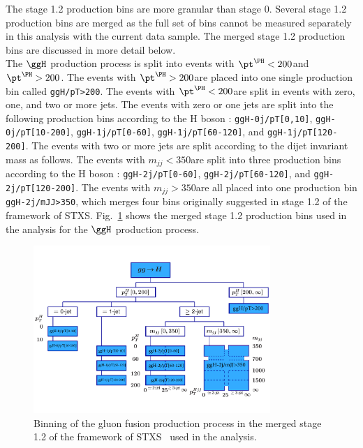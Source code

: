 The stage 1.2 production bins are more granular than stage 0.
Several stage 1.2 production bins are merged as the full set of bins cannot be measured separately in this analysis with the current data sample.
The merged stage 1.2 production bins are discussed in more detail below.
\\
The $\ggH$ production process is split into events with $\pt^{\PH}<200$\GeV and $\pt^{\PH}>200$\GeV.
The events with $\pt^{\PH}>200$\GeV are placed into one single production bin called {\tt ggH/pT>200}.
The events with $\pt^{\PH}<200$\GeV are split in events with zero, one, and two or more jets.
The events with zero or one jets are split into the following production bins according to the H boson \pt : {\tt ggH-0j/pT[0,10]}, {\tt ggH-0j/pT[10-200]}, {\tt ggH-1j/pT[0-60]}, {\tt ggH-1j/pT[60-120]}, and {\tt ggH-1j/pT[120-200]}.
The events with two or more jets are split according to the dijet invariant mass as follows.
The events with $m_{jj}<350$\GeV are split into three production bins according to the H boson \pt: {\tt ggH-2j/pT[0-60]}, {\tt ggH-2j/pT[60-120]}, and {\tt ggH-2j/pT[120-200]}.
The events with $m_{jj}>350$\GeV are all placed into one production bin {\tt ggH-2j/mJJ>350}, which merges four bins originally suggested in stage 1.2 of the framework of STXS.
Fig.~\ref{fig:stage1_ggH} shows the merged stage 1.2 production bins used in the analysis for the $\ggH$ production process.
\begin{figure}[!htb]
	\vspace*{0.3cm}
	\begin{center}
		\includegraphics[width=0.8\textwidth]{Figures/stxs/simplifiedXS_ggF_11.pdf}
		\caption{Binning of the gluon fusion production process in the merged stage 1.2 of the framework of STXS~\cite{Berger:2019wnu} used in the analysis.
		\label{fig:stage1_ggH}}
	\end{center}
\end{figure}
